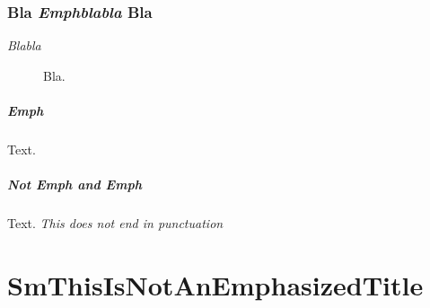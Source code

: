 \subsection{Bla \textit{Emphblabla} Bla}
\label{s:9}
\begin{description}
\item[\emph{Blabla}] Bla.
\end{description}

\paragraph{\emph{Emph}}
Text.

\paragraph{Not Emph and \emph{Emph}}
Text.
\emph{This does not end in punctuation }

\chapter{SmThisIsNotAnEmphasizedTitle}
\label{s:10}
